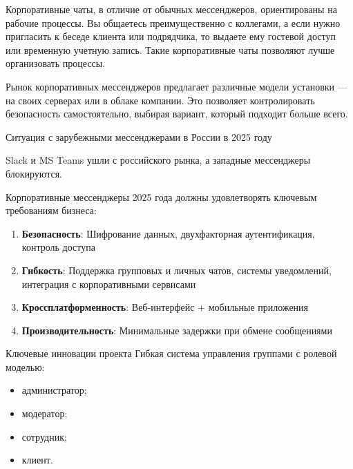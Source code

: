 Корпоративные чаты, в отличие от обычных мессенджеров, ориентированы на рабочие процессы. Вы общаетесь преимущественно с коллегами, а если нужно пригласить к беседе клиента или подрядчика, то выдаете ему гостевой доступ или временную учетную запись. Такие корпоративные чаты позволяют лучше организовать процессы.

Рынок корпоративных мессенджеров предлагает различные модели установки — на своих серверах или в облаке компании. Это позволяет контролировать безопасность самостоятельно, выбирая вариант, который подходит больше всего.

Ситуация с зарубежными мессенджерами в России в 2025 году

Slack и MS Teams ушли с российского рынка, а западные мессенджеры блокируются.

Корпоративные мессенджеры 2025 года должны удовлетворять ключевым требованиям бизнеса:
\begin{enumerate}
	\item \textbf{Безопасность}: Шифрование данных, двухфакторная аутентификация, контроль доступа
	\item \textbf{Гибкость}: Поддержка групповых и личных чатов, системы уведомлений, интеграция с корпоративными сервисами
	\item \textbf{Кроссплатформенность}: Веб-интерфейс + мобильные приложения
	\item \textbf{Производительность}: Минимальные задержки при обмене сообщениями
\end{enumerate}

{Ключевые инновации проекта}
Гибкая система управления группами с ролевой моделью:
\begin{itemize}
	\item администратор;
	\item модератор;
	\item сотрудник;
	\item клиент.
\end{itemize}
		

